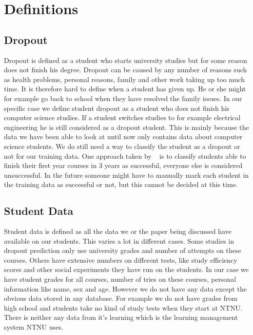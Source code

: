 \section{Definitions}
\subsection{Dropout}
Dropout is defined as a student who starts university studies but for some reason does not finish his degree. 
Dropout can be caused by any number of reasons such as health problems, personal reasons, family and other work taking up too much time.
It is therefore hard to define when a student has given up. 
He or she might for example go back to school when they have resolved the family issues.
In our specific case we define student dropout as a student who does not finish his computer science studies.
If a student switches studies to for example electrical engineering he is still considered as a dropout student.
This is mainly because the data we have been able to look at until now only contains data about computer science students.
We do still need a way to classify the student as a dropout or not for our training data.
One approach taken by ~\cite{7} is to classify students able to finish their first year courses in 3 years as successful,
everyone else is considered unsuccessful.
In the future someone might have to manually mark each student in the training data as successful or not,
but this cannot be decided at this time.

\subsection{Student Data}
Student data is defined as all the data we or the paper being discussed have available on our students.
This varies a lot in different cases.
Some studies in dropout prediction only use university grades and number of attempts on these courses.
Others have extensive numbers on different tests,
like study efficiency scores and other social experiments they have run on the students. 
In our case we have student grades for all courses,
number of tries on these courses,
personal information like name, sex and age.
However we do not have any data except the obvious data stored in any database.
For example we do not have grades from high school and students take no kind of study tests when they start at NTNU.
There is neither any data from it's learning which is the learning management system NTNU uses. 

